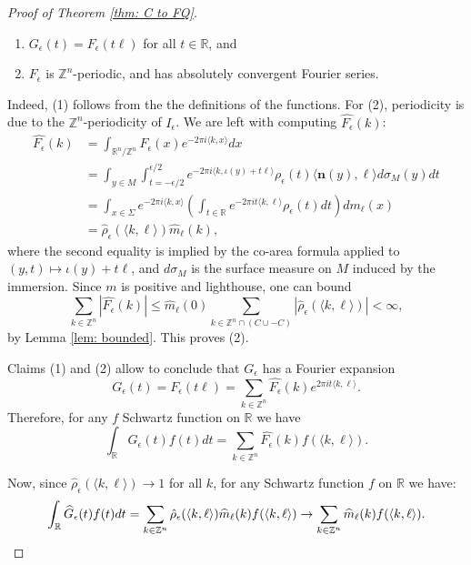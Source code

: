 \documentclass[11pt,letterpaper]{amsart}
\theoremstyle{definition}
\theoremstyle{plain}
\newcommand{\nfield}{\mathbf n}
\newcommand{\R}{{\mathbb R}}
\newcommand{\Z}{{\mathbb Z}}
\begin{document}
\begin{proof}[Proof of Theorem \ref{thm: C to FQ}]
\begin{enumerate}
    \item $G_\epsilon(t)=F_{\epsilon}(t\ell)$ for all $t\in\R$, and
    \item $F_{\epsilon}$ is $\Z^n$-periodic, and has absolutely convergent Fourier series. 
\end{enumerate}
Indeed, (1) follows from the the definitions of the functions. For (2), periodicity is due to the $\Z^n$-periodicity of $I_{\epsilon}$. We are left with computing $\widehat{F_{\epsilon}}(k)$:
\begin{align*}
    \widehat{F_{\epsilon}}(k)& = \int_{\R^n/\Z^n}F_{\epsilon}(x)e^{-2\pi i \langle k,x\rangle}dx\\
    & =\int_{y\in M}\int_{t=-\epsilon/2}^{\epsilon/2}e^{-2\pi i \langle k,\iota(y)+t\ell\rangle} \rho_{\epsilon}(t)\langle \nfield(y),\ell\rangle d\sigma_{M}(y)dt\\
    & =\int_{x\in \Sigma}e^{-2\pi i \langle k,x\rangle}\left(\int_{t\in\R}e^{-2\pi i t \langle k,\ell\rangle} \rho_{\epsilon}(t)dt\right)dm_{\ell}(x)\\
    & = 
    \hat{\rho}_{\epsilon}(\langle k,\ell\rangle)\widehat{m}_{\ell}(k),
\end{align*}
where the second equality is implied by the co-area formula applied to
$(y,t)\mapsto \iota(y)+t\ell$, and $d\sigma_{M}$ is the surface measure on $M$
induced by the immersion. 
Since $m$ is positive and lighthouse, one can bound
\[\sum_{k\in\Z^n}|\widehat{F_{\epsilon}}(k)|\le \widehat{m}_{\ell}(0)\sum_{k\in\Z^n\cap\left(C\cup-C\right)}|\hat{\rho}_{\epsilon}(\langle k,\ell\rangle)|<\infty ,\]
by Lemma \ref{lem: bounded}. This proves (2).


Claims (1) and (2) allow to conclude that $G_{\epsilon}$ has a Fourier expansion
\[G_{\epsilon}(t)=F_{\epsilon}(t\ell)=\sum_{k\in\Z^n}\widehat{F_{\epsilon}}(k)e^{2\pi i t\langle k,\ell\rangle }.\]
Therefore, for any $f$ Schwartz function on $\R$ we have
\[\int_{\R}\widehat{G}_{\epsilon}(t){f}(t)dt=\sum_{k\in\Z^n}\widehat{F_{\epsilon}}(k){f}(\langle k , \ell\rangle).\]

Now, since $\hat{\rho}_{\epsilon}(\langle k,\ell\rangle)\to 1$ for all $k$, for any Schwartz function $f$ on $\R$ we have:
\[\int_{\R}\widehat{G}_{\epsilon}(t){f}(t)dt=\sum_{k\in\Z^n}\hat{\rho}_{\epsilon}(\langle k,\ell\rangle)\widehat{m}_{\ell}(k){f}(\langle k , \ell\rangle)\to \sum_{k\in\Z^n}\widehat{m}_{\ell}(k){f}(\langle k , \ell\rangle).\qedhere\]
\end{proof}
\end{document}
